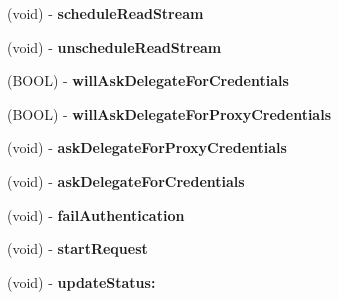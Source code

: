 \begin{DoxyCompactItemize}
\item 
\hypertarget{interface_a_s_i_h_t_t_p_request_07_08_a9298c802e2cd503d0f3ae6f508f59e52}{
(void) -\/ {\bfseries schedule\-Read\-Stream}}
\label{interface_a_s_i_h_t_t_p_request_07_08_a9298c802e2cd503d0f3ae6f508f59e52}

\item 
\hypertarget{interface_a_s_i_h_t_t_p_request_07_08_a036ae593e23c948377acca2d405ab265}{
(void) -\/ {\bfseries unschedule\-Read\-Stream}}
\label{interface_a_s_i_h_t_t_p_request_07_08_a036ae593e23c948377acca2d405ab265}

\item 
\hypertarget{interface_a_s_i_h_t_t_p_request_07_08_a2fb19d10e5d6449c7845042add6dc2a1}{
(\-B\-O\-O\-L) -\/ {\bfseries will\-Ask\-Delegate\-For\-Credentials}}
\label{interface_a_s_i_h_t_t_p_request_07_08_a2fb19d10e5d6449c7845042add6dc2a1}

\item 
\hypertarget{interface_a_s_i_h_t_t_p_request_07_08_a52ecd8ea9d13c585c86a7f9031f1d2e8}{
(\-B\-O\-O\-L) -\/ {\bfseries will\-Ask\-Delegate\-For\-Proxy\-Credentials}}
\label{interface_a_s_i_h_t_t_p_request_07_08_a52ecd8ea9d13c585c86a7f9031f1d2e8}

\item 
\hypertarget{interface_a_s_i_h_t_t_p_request_07_08_a545869781fbd1e24ed126da754536006}{
(void) -\/ {\bfseries ask\-Delegate\-For\-Proxy\-Credentials}}
\label{interface_a_s_i_h_t_t_p_request_07_08_a545869781fbd1e24ed126da754536006}

\item 
\hypertarget{interface_a_s_i_h_t_t_p_request_07_08_a44501e22716b6373457e7f235775662c}{
(void) -\/ {\bfseries ask\-Delegate\-For\-Credentials}}
\label{interface_a_s_i_h_t_t_p_request_07_08_a44501e22716b6373457e7f235775662c}

\item 
\hypertarget{interface_a_s_i_h_t_t_p_request_07_08_aa65e69f36b090b963669094ce4e3ba31}{
(void) -\/ {\bfseries fail\-Authentication}}
\label{interface_a_s_i_h_t_t_p_request_07_08_aa65e69f36b090b963669094ce4e3ba31}

\item 
\hypertarget{interface_a_s_i_h_t_t_p_request_07_08_ae64756aed5b2103d48f7a10c04916c60}{
(void) -\/ {\bfseries start\-Request}}
\label{interface_a_s_i_h_t_t_p_request_07_08_ae64756aed5b2103d48f7a10c04916c60}

\item 
\hypertarget{interface_a_s_i_h_t_t_p_request_07_08_ab0847444e15b9b0263c5bedd8faa151a}{
(void) -\/ {\bfseries update\-Status\-:}}
\label{interface_a_s_i_h_t_t_p_request_07_08_ab0847444e15b9b0263c5bedd8faa151a}


\end{DoxyCompactItemize}
